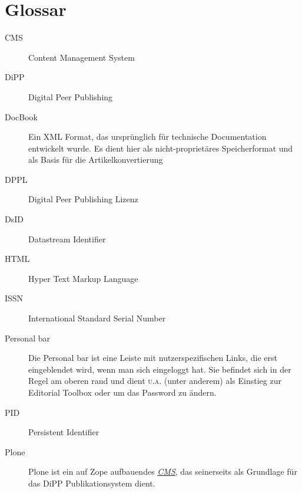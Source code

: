 \documentclass[a4paper,10pt,ngerman]{sphinxmanual}
\begin{document}
\section{Glossar}
\label{glossar:virtualenv}\label{glossar:glossar}\label{glossar::doc}\begin{description}
\item[{CMS}] \leavevmode{}\label{glossar:term-cms}
Content Management System

\item[{DiPP}] \leavevmode{}\label{glossar:term-dipp}
Digital Peer Publishing

\item[{DocBook}] \leavevmode{}\label{glossar:term-docbook}
Ein XML Format, das ursprünglich für technische Documentation
entwickelt wurde. Es dient hier als nicht-proprietäres Speicherformat
und als Basis für die Artikelkonvertierung

\item[{DPPL}] \leavevmode{}\label{glossar:term-dppl}
Digital Peer Publishing Lizenz

\item[{DsID}] \leavevmode{}\label{glossar:term-dsid}
Datastream Identifier

\item[{HTML}] \leavevmode{}\label{glossar:term-html}
Hyper Text Markup Language

\item[{ISSN}] \leavevmode{}\label{glossar:term-issn}
International Standard Serial Number

\item[{Personal bar}] \leavevmode{}\label{glossar:term-personal-bar}
Die Personal bar ist eine Leiste mit nutzerspezifischen Links, die erst
eingeblendet wird, wenn man sich eingeloggt hat. Sie befindet sich in
der Regel am oberen rand und dient \textsc{u.a.} (unter anderem) als
Einstieg zur Editorial Toolbox oder um das Password zu ändern.

\item[{PID}] \leavevmode{}\label{glossar:term-pid}
Persistent Identifier

\item[{Plone}] \leavevmode{}\label{glossar:term-plone}
Plone ist ein auf Zope aufbauendes {\hyperref[glossar:term-cms]{\emph{CMS}}}, das seinerseits als Grundlage
für das DiPP Publikationsystem dient.


\end{description}
\end{document}
